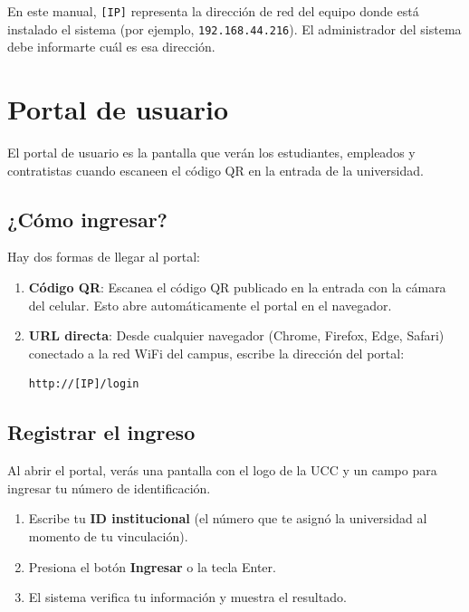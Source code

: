 \documentclass[12pt, a4paper]{article}
\begin{document}
\begin{nota}
  En este manual, \texttt{[IP]} representa la dirección de red del equipo
  donde está instalado el sistema (por ejemplo, \texttt{192.168.44.216}).
  El administrador del sistema debe informarte cuál es esa dirección.
\end{nota}

\section{Portal de usuario}
\label{sec:portal}

El portal de usuario es la pantalla que verán los estudiantes,
empleados y contratistas cuando escaneen el código QR en la entrada
de la universidad.

\subsection{¿Cómo ingresar?}

Hay dos formas de llegar al portal:

\begin{enumerate}
  \item \textbf{Código QR}: Escanea el código QR publicado en la entrada
        con la cámara del celular. Esto abre automáticamente el portal
        en el navegador.

  \item \textbf{URL directa}: Desde cualquier navegador (Chrome, Firefox,
        Edge, Safari) conectado a la red WiFi del campus, escribe la
        dirección del portal:
        \begin{lstlisting}
http://[IP]/login
        \end{lstlisting}
\end{enumerate}

\subsection{Registrar el ingreso}

Al abrir el portal, verás una pantalla con el logo de la UCC y un campo
para ingresar tu número de identificación.

\begin{enumerate}
  \item Escribe tu \textbf{ID institucional} (el número que te asignó la
        universidad al momento de tu vinculación).
  \item Presiona el botón \textbf{Ingresar} o la tecla Enter.
  \item El sistema verifica tu información y muestra el resultado.
\end{enumerate}
\end{document}
